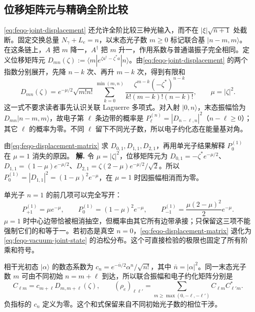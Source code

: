 \subsection{位移矩阵元与精确全阶比较}

\cref{eq:feqo-joint-displacement} 还允许全阶比较三种光输入，而不在 \(|\xi|\sqrt{\bar n+1}\) 处截断。固定交换总量 \(N_\gamma+L_e=n\)，以末态光子数 \(m\geq0\) 标记联合基 \(|n-m,m\rangle\)。在这条链上，\(A\) 把 \(m\) 降一，\(A^\dagger\) 把 \(m\) 升一，作用系数与普通谐振子完全相同。定义位移矩阵元 \(D_{mn}(\zeta):=\langle m|e^{\zeta a^\dagger-\zeta^*a}|n\rangle\)。由\cref{eq:feqo-joint-displacement} 的两个指数分别展开，先降 \(n-k\) 次、再升 \(m-k\) 次，得到有限和
\begin{equation}
D_{mn}(\zeta)=e^{-\mu/2}\sqrt{m!n!}
\sum_{k=0}^{\min(m,n)}
\frac{\zeta^{m-k}(-\zeta^*)^{n-k}}
{k!(m-k)!(n-k)!},\qquad \mu=|\zeta|^2.
\label{eq:feqo-displacement-matrix}
\end{equation}
这一式不要求读者事先认识关联 Laguerre 多项式。对入射 \(|0,n\rangle\)，末态振幅恰为 \(D_{mn}|n-m,m\rangle\)，故电子第 \(\ell\) 条边带的概率是 \(P_\ell^{(n)}=|D_{n-\ell,n}|^2\)（\(n-\ell\geq0\)）；其它 \(\ell\) 的概率为零。不同 \(\ell\) 留下不同光子数，所以电子约化态在能量基对角。


\par
\begin{workedexample}
由\cref{eq:feqo-displacement-matrix} 求 \(D_{0,1},D_{1,1},D_{2,1}\)，再用单光子结果解释 \(P_0^{(1)}\) 在 \(\mu=1\) 消失的原因。
\textbf{解.} 令 \(\mu=|\zeta|^2\)，位移矩阵元为 \(D_{0,1}=-\zeta^*e^{-\mu/2}\)、\(D_{1,1}=(1-\mu)e^{-\mu/2}\)、\(D_{2,1}=\zeta(2-\mu)e^{-\mu/2}/\sqrt2\)。所以 \(P_0^{(1)}=|D_{1,1}|^2=(1-\mu)^2e^{-\mu}\)，在 \(\mu=1\) 时因振幅相消而为零。
\end{workedexample}
\par
单光子 \(n=1\) 的前几项可以完全写开：
\[
P_{+1}^{(1)}=\mu e^{-\mu},\qquad
P_0^{(1)}=(1-\mu)^2e^{-\mu},\qquad
P_{-1}^{(1)}=\frac{\mu(2-\mu)^2}{2}e^{-\mu}.
\]
\(\mu=1\) 时中心边带恰被相消抽空，但概率由其它所有边带承接；只保留这三项不能强制它们的和等于一。若初态是真空 \(n=0\)，\cref{eq:feqo-displacement-matrix} 退化为\cref{eq:feqo-vacuum-joint-state} 的泊松分布。这个可直接检验的极限也固定了所有阶乘和符号。

相干光初态 \(|\alpha\rangle\) 的数态系数为 \(c_n=e^{-\bar n/2}\alpha^n/\sqrt{n!}\)，其中 \(\bar n=|\alpha|^2\)。同一末态光子数 \(m\) 可由不同初始 \(n=m+\ell\) 到达，所以联合振幅和电子约化矩阵分别是
\begin{equation}
C_{\ell m}=c_{m+\ell}D_{m,m+\ell}(\zeta),\qquad
(\rho_e)_{\ell\ell'}=\sum_{m\geq\max(0,-\ell,-\ell')}
C_{\ell m}C_{\ell'm}^* .
\label{eq:feqo-coherent-reduced-exact}
\end{equation}
负指标的 \(c_n\) 定义为零。这个和式保留来自不同初始光子数的相位干涉。





